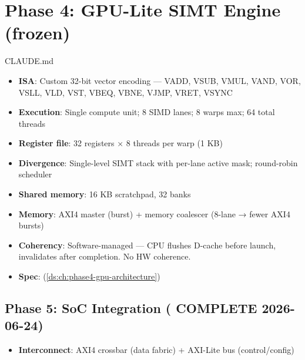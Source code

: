 \chapter{Phase 4: GPU-Lite SIMT Engine (frozen)}\label{ds:ch:phase4-5-architecture}
\begin{relocated}{CLAUDE.md}

\begin{itemize}
\tightlist
\item
  \textbf{ISA}: Custom 32-bit vector encoding --- VADD, VSUB, VMUL,
  VAND, VOR, VSLL, VLD, VST, VBEQ, VBNE, VJMP, VRET, VSYNC
\item
  \textbf{Execution}: Single compute unit; 8 SIMD lanes; 8 warps max; 64
  total threads
\item
  \textbf{Register file}: 32 registers × 8 threads per warp (1 KB)
\item
  \textbf{Divergence}: Single-level SIMT stack with per-lane active
  mask; round-robin scheduler
\item
  \textbf{Shared memory}: 16 KB scratchpad, 32 banks
\item
  \textbf{Memory}: AXI4 master (burst) + memory coalescer (8-lane →
  fewer AXI4 bursts)
\item
  \textbf{Coherency}: Software-managed --- CPU flushes D-cache before
  launch, invalidates after completion. No HW coherence.
\item
  \textbf{Spec}:  (\cref{ds:ch:phase4-gpu-architecture})
\end{itemize}

\section{\texorpdfstring{Phase 5: SoC Integration (\ok{} COMPLETE
2026-06-24)}{Phase 5: SoC Integration ( COMPLETE 2026-06-24)}}\label{ds:ch:phase4-5-architecture:phase-5-soc-integration-white-check-mark-complete-2026-06-24}

\begin{itemize}
\tightlist
\item
  \textbf{Interconnect}: AXI4 crossbar (data fabric) + AXI-Lite bus
  (control/\allowbreak{}config)


\end{itemize}
\end{relocated}
